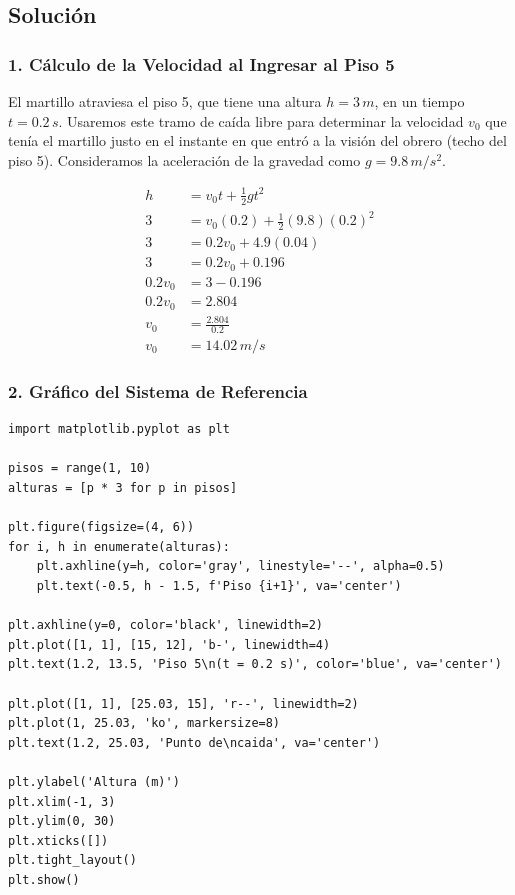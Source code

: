 \documentclass[12pt, a4paper]{article}
\begin{document}
\subsection*{Solución}

\subsubsection*{1. Cálculo de la Velocidad al Ingresar al Piso 5}
El martillo atraviesa el piso 5, que tiene una altura $h = 3 \, \si{m}$, en un tiempo $t = 0.2 \, \si{s}$. Usaremos este tramo de caída libre para determinar la velocidad $v_0$ que tenía el martillo justo en el instante en que entró a la visión del obrero (techo del piso 5). Consideramos la aceleración de la gravedad como $g = 9.8 \, \si{m/s^2}$.

\begin{align*}
h &= v_0 t + \frac{1}{2} g t^2 \\
3 &= v_0(0.2) + \frac{1}{2}(9.8)(0.2)^2 \\
3 &= 0.2 v_0 + 4.9(0.04) \\
3 &= 0.2 v_0 + 0.196 \\
0.2 v_0 &= 3 - 0.196 \\
0.2 v_0 &= 2.804 \\
v_0 &= \frac{2.804}{0.2} \\
v_0 &= 14.02 \, \si{m/s}
\end{align*}

\subsubsection*{2. Gráfico del Sistema de Referencia}
\begin{lstlisting}
import matplotlib.pyplot as plt

pisos = range(1, 10)
alturas = [p * 3 for p in pisos]

plt.figure(figsize=(4, 6))
for i, h in enumerate(alturas):
    plt.axhline(y=h, color='gray', linestyle='--', alpha=0.5)
    plt.text(-0.5, h - 1.5, f'Piso {i+1}', va='center')

plt.axhline(y=0, color='black', linewidth=2)
plt.plot([1, 1], [15, 12], 'b-', linewidth=4)
plt.text(1.2, 13.5, 'Piso 5\n(t = 0.2 s)', color='blue', va='center')

plt.plot([1, 1], [25.03, 15], 'r--', linewidth=2)
plt.plot(1, 25.03, 'ko', markersize=8)
plt.text(1.2, 25.03, 'Punto de\ncaida', va='center')

plt.ylabel('Altura (m)')
plt.xlim(-1, 3)
plt.ylim(0, 30)
plt.xticks([])
plt.tight_layout()
plt.show()
\end{lstlisting}
\end{document}
